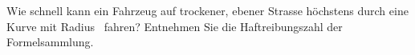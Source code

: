 Wie schnell kann ein Fahrzeug auf trockener, ebener Strasse höchstens durch eine Kurve mit Radius \rKuO\ fahren? Entnehmen Sie die Haftreibungszahl der Formelsammlung.
